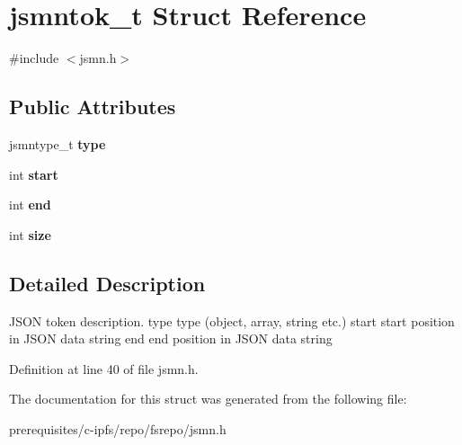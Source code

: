 \hypertarget{structjsmntok__t}{}\section{jsmntok\+\_\+t Struct Reference}
\label{structjsmntok__t}


{\ttfamily \#include $<$jsmn.\+h$>$}

\subsection*{Public Attributes}
\begin{DoxyCompactItemize}
\item 
\mbox{\label{structjsmntok__t_ac03dbd6b83cbcd979eb64702d5b9943e}} 
jsmntype\+\_\+t {\bfseries type}
\item 
\mbox{\label{structjsmntok__t_a0a8f55d0095f268ce8e224fe1234acd0}} 
int {\bfseries start}
\item 
\mbox{\label{structjsmntok__t_ab49e0369f39e9b6174141e7f5bde5996}} 
int {\bfseries end}
\item 
\mbox{\label{structjsmntok__t_a8ac3694b7335456c8e602197778883db}} 
int {\bfseries size}
\end{DoxyCompactItemize}


\subsection{Detailed Description}
J\+S\+ON token description. type type (object, array, string etc.) start start position in J\+S\+ON data string end end position in J\+S\+ON data string 

Definition at line 40 of file jsmn.\+h.



The documentation for this struct was generated from the following file\+:\begin{DoxyCompactItemize}
\item 
prerequisites/c-\/ipfs/repo/fsrepo/jsmn.\+h\end{DoxyCompactItemize}
